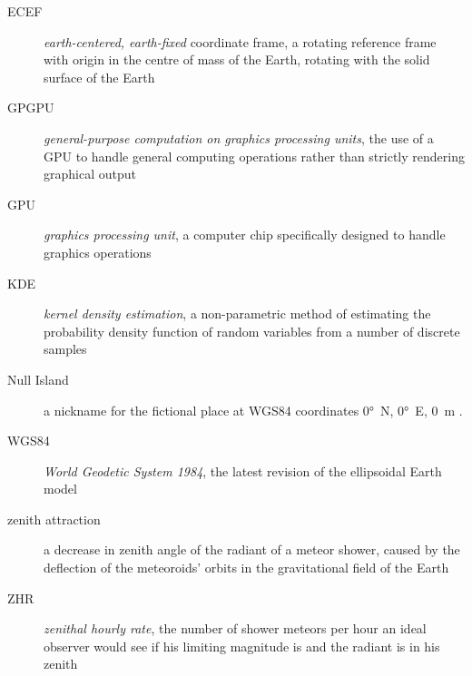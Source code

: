 \begin{description}
    \item[ECEF]
        \emph{earth-centered, earth-fixed} coordinate frame, a rotating reference frame with origin
        in the centre of mass of the Earth, rotating with the solid surface of the Earth \cite{ecef}
    \item[GPGPU]
        \emph{general-purpose computation on graphics processing units},
        the use of a GPU to handle general computing operations rather than strictly rendering graphical output \cite{techterms}
    \item[GPU]
        \emph{graphics processing unit}, a computer chip specifically designed to handle graphics operations \cite{techterms}
    \item[KDE]
        \emph{kernel density estimation}, a non-parametric method of estimating the probability density function
        of random variables from a number of discrete samples \cite{kde}
    \item[Null Island]
        a nickname for the fictional place at WGS84 coordinates \ang{0}~N, \ang{0}~E, \SI{0}{\metre} \cite{null-island}.
    \item[WGS84]
        \emph{World Geodetic System 1984}, the latest revision of the ellipsoidal Earth model \cite{wgs84}
    \item[zenith attraction]
        a decrease in zenith angle of the radiant of a meteor shower, caused by the deflection of the meteoroids' orbits in the
        gravitational field of the Earth \cite{lovell1954}
    \item[ZHR]
        \emph{zenithal hourly rate}, the number of shower meteors per hour an ideal observer would see
            if his limiting magnitude is  and the radiant is in his zenith \cite{imo-glossary}

\end{description}
